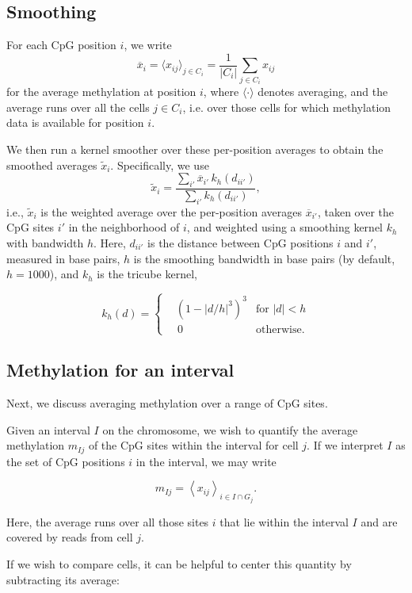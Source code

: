 \documentclass[twocolumn,10pt]{article}
\begin{document}
\subsection{Smoothing}

For each CpG position $i$, we write 
$$\overline{x}_i=\langle x_{ij} \rangle_{j\in C_i} = \frac{1}{|C_i|}\sum_{j\in C_i} x_{ij}$$ 
for the average methylation at position $i$, where $\langle\cdot\rangle$ denotes averaging, and the average runs over all the cells $j\in C_i$, i.e.
over those cells for which methylation data is available for position $i$.

We then run a kernel smoother over these per-position averages to obtain the smoothed averages $\tilde x_i$.
Specifically, we use
\[ \tilde x_i = \frac{\sum_{i'} \overline x_{i'}\, k_h(d_{ii'})}{\sum_{i'} k_h(d_{ii'})},\]
i.e., $\tilde x_i$ is the weighted average over the per-position averages $\overline{x}_{i'}$, taken over the CpG sites $i'$ in the neighborhood of $i$, and weighted using a smoothing kernel $k_h$ with bandwidth $h$.
Here, $d_{ii'}$ is the distance between CpG positions $i$ and $i'$, measured in base pairs, $h$ is the smoothing bandwidth in base pairs (by default, $h=1000$), and $k_h$ is the tricube kernel,

\[ k_h(d) = \left\{
\begin{aligned}
    &\left(1-|d/h|^3\right)^3 &\text{for } |d|<h \\
    &\,0 &\text{otherwise}.
\end{aligned}
\right.
\]

\subsection{Methylation for an interval}

Next, we discuss averaging methylation over a range of CpG sites.

Given an interval $I$ on the chromosome, we wish to quantify the average methylation $m_{Ij}$ of the CpG sites within the interval for cell $j$.
If we interpret $I$ as the set of CpG positions $i$ in the interval, we may write

$$ m_{Ij} = \left< x_{ij} \right>_{i\in I\cap G_j}.$$

Here, the average runs over all those sites $i$ that lie within the interval $I$ and are covered by reads from cell $j$.

If we wish to compare cells, it can be helpful to center this quantity by subtracting its average:
\end{document}
